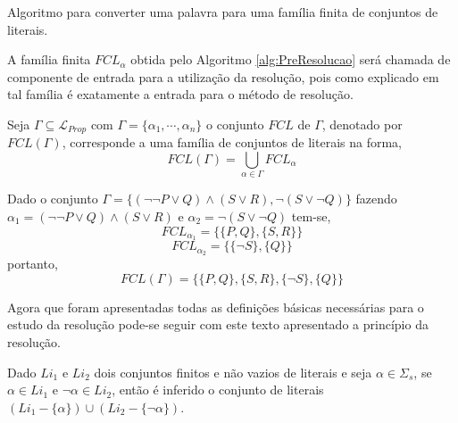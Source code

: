 \begin{algorithm}[h]
    \caption{Algoritmo para converter uma palavra para uma família finita de conjuntos de literais.}
    \label{alg:PreResolucao}
\end{algorithm}

A família finita $FCL_\alpha$ obtida pelo Algoritmo \ref{alg:PreResolucao} será chamada de componente de entrada para a utilização da resolução, pois como explicado em \cite{joaoPavao2014, ayala2014} tal família é exatamente a entrada para o método de resolução.

\begin{definition}
    Seja $\Gamma \subseteq \mathcal{L}_{Prop}$ com $\Gamma = \{\alpha_1, \cdots, \alpha_n\}$ o conjunto $FCL$ de $\Gamma$, denotado por $FCL(\Gamma)$, corresponde a uma família de conjuntos de literais na forma,
    $$FCL(\Gamma) = \bigcup_{\alpha \in \Gamma} FCL_\alpha$$
\end{definition}

\begin{exem}
    Dado o conjunto $\Gamma = \{(\neg\neg P \lor Q) \land (S \lor R), \neg(S \lor \neg  Q)\}$ fazendo $\alpha_1 = (\neg\neg P \lor Q) \land (S \lor R)$ e $\alpha_2 = \neg(S \lor \neg  Q)$ tem-se,
    $$FCL_{\alpha_1} = \{\{P, Q\}, \{S, R\}\}$$
    $$FCL_{\alpha_2} = \{\{\neg  S\}, \{Q\}\}$$
    portanto, 
    $$FCL(\Gamma) = \{\{P, Q\}, \{S, R\}, \{\neg S\}, \{Q\}\}$$
\end{exem}


Agora que foram apresentadas todas as definições básicas necessárias para o estudo da resolução pode-se seguir com este texto apresentado a princípio da resolução.

\begin{definition}
    Dado $Li_1$  e $Li_2$ dois conjuntos finitos e não vazios de literais e seja $\alpha \in \Sigma_s$, se $\alpha \in Li_1$ e $\neg \alpha \in Li_2$, então é inferido o conjunto de literais $(Li_1 - \{\alpha\}) \cup (Li_2 - \{\neg \alpha\})$.
\end{definition}


